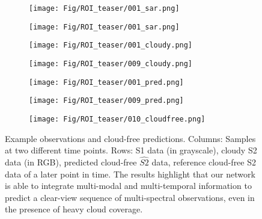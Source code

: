 \documentclass[journal]{IEEEtran}
\begin{document}
\begin{figure}[h!tb]
  \centering
  \begin{subfigure}[b]{0.48\linewidth}
    \texttt{[image: Fig/ROI\_teaser/001\_sar.png]}
  \end{subfigure}
    \begin{subfigure}[b]{0.48\linewidth}
    \texttt{[image: Fig/ROI\_teaser/001\_sar.png]}
  \end{subfigure}
  
  \begin{subfigure}[b]{0.48\linewidth}
    \texttt{[image: Fig/ROI\_teaser/001\_cloudy.png]}
  \end{subfigure}
    \begin{subfigure}[b]{0.48\linewidth}
    \texttt{[image: Fig/ROI\_teaser/009\_cloudy.png]}
  \end{subfigure}

\begin{subfigure}[b]{0.48\linewidth}
    \texttt{[image: Fig/ROI\_teaser/001\_pred.png]}
  \end{subfigure}
    \begin{subfigure}[b]{0.48\linewidth}
    \texttt{[image: Fig/ROI\_teaser/009\_pred.png]}
  \end{subfigure}


  \begin{subfigure}[tb]{0.975\linewidth}
    \texttt{[image: Fig/ROI\_teaser/010\_cloudfree.png]}
  \end{subfigure}
  \caption{Example observations and cloud-free predictions. Columns: Samples at two different time points. Rows: S1 data (in grayscale), cloudy S2 data (in RGB), predicted cloud-free $\hat{S2}$ data, reference cloud-free S2 data of a later point in time. The results highlight that our network is able to integrate multi-modal and multi-temporal information to predict a clear-view sequence of multi-spectral observations, even in the presence of heavy cloud coverage.}
  \label{fig:teaser}
\end{figure}
\end{document}
